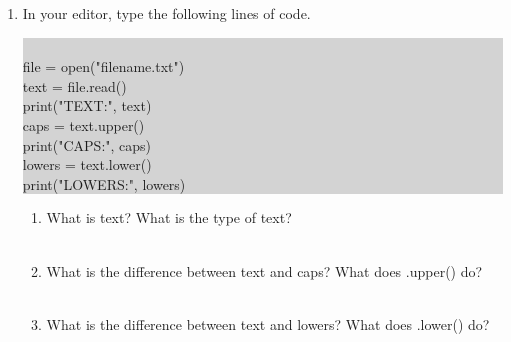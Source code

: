 \documentclass[11pt, letterpaper, onecolumn, oneside, final]{article}
\begin{document}
\begin{enumerate}
\item In your editor, type the following lines of code.
\begin{center}
\colorbox{lightgray}{\parbox{.6\textwidth}{\consolas\\
file = open("filename.txt")\\
text = file.read()\\
print("TEXT:", text)\\
caps = text.upper()\\
print("CAPS:", caps)\\
lowers = text.lower()\\
print("LOWERS:", lowers)}}
\end{center}
\begin{enumerate}
\item What is {\consolas text}? What is the type of {\consolas text}?\\\\
\item What is the difference between {\consolas text} and {\consolas caps}? What does {\consolas .upper()} do?\\\\
\item What is the difference between {\consolas text} and {\consolas lowers}? What does {\consolas .lower()} do?\\\\
\end{enumerate}
\end{enumerate}
\end{document}
